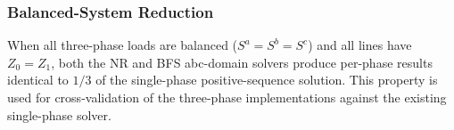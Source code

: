 \subsubsection{Balanced-System Reduction}

When all three-phase loads are balanced ($S^a = S^b = S^c$) and all lines have
$Z_0 = Z_1$, both the NR and BFS abc-domain solvers produce per-phase results
identical to $1/3$ of the single-phase positive-sequence solution.  This
property is used for cross-validation of the three-phase implementations against
the existing single-phase solver.
